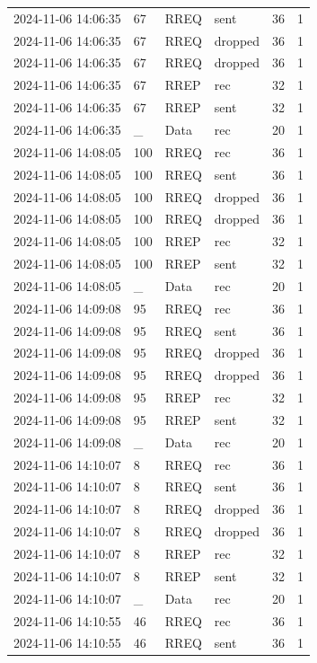 \documentclass[]{nsm-thesis}
\begin{document}
\begin{longtable}{llllll}
2024-11-06 14:06:35 & 67 & RREQ & sent & 36 & 1 \\
2024-11-06 14:06:35 & 67 & RREQ & dropped & 36 & 1 \\
2024-11-06 14:06:35 & 67 & RREQ & dropped & 36 & 1 \\
2024-11-06 14:06:35 & 67 & RREP & rec & 32 & 1 \\
2024-11-06 14:06:35 & 67 & RREP & sent & 32 & 1 \\
2024-11-06 14:06:35 & _ & Data & rec & 20 & 1 \\
2024-11-06 14:08:05 & 100 & RREQ & rec & 36 & 1 \\
2024-11-06 14:08:05 & 100 & RREQ & sent & 36 & 1 \\
2024-11-06 14:08:05 & 100 & RREQ & dropped & 36 & 1 \\
2024-11-06 14:08:05 & 100 & RREQ & dropped & 36 & 1 \\
2024-11-06 14:08:05 & 100 & RREP & rec & 32 & 1 \\
2024-11-06 14:08:05 & 100 & RREP & sent & 32 & 1 \\
2024-11-06 14:08:05 & _ & Data & rec & 20 & 1 \\
2024-11-06 14:09:08 & 95 & RREQ & rec & 36 & 1 \\
2024-11-06 14:09:08 & 95 & RREQ & sent & 36 & 1 \\
2024-11-06 14:09:08 & 95 & RREQ & dropped & 36 & 1 \\
2024-11-06 14:09:08 & 95 & RREQ & dropped & 36 & 1 \\
2024-11-06 14:09:08 & 95 & RREP & rec & 32 & 1 \\
2024-11-06 14:09:08 & 95 & RREP & sent & 32 & 1 \\
2024-11-06 14:09:08 & _ & Data & rec & 20 & 1 \\
2024-11-06 14:10:07 & 8 & RREQ & rec & 36 & 1 \\
2024-11-06 14:10:07 & 8 & RREQ & sent & 36 & 1 \\
2024-11-06 14:10:07 & 8 & RREQ & dropped & 36 & 1 \\
2024-11-06 14:10:07 & 8 & RREQ & dropped & 36 & 1 \\
2024-11-06 14:10:07 & 8 & RREP & rec & 32 & 1 \\
2024-11-06 14:10:07 & 8 & RREP & sent & 32 & 1 \\
2024-11-06 14:10:07 & _ & Data & rec & 20 & 1 \\
2024-11-06 14:10:55 & 46 & RREQ & rec & 36 & 1 \\
2024-11-06 14:10:55 & 46 & RREQ & sent & 36 & 1 \\

\end{longtable}
\end{document}

